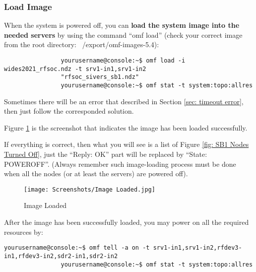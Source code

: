 \documentclass{article}
\begin{document}
    
        \subsubsection{Load Image}
            When the system is powered off, you can \textbf{load the system image into the needed servers} by using the command ``omf load'' (check your correct image from the root directory: ~/export/omf-images-5.4):
            \begin{verbatim}
                yourusername@console:~$ omf load -i wides2021_rfsoc.ndz -t srv1-in1,srv1-in2
                "rfsoc_sivers_sb1.ndz"
                yourusername@console:~$ omf stat -t system:topo:allres
            \end{verbatim}
            
            
            Sometimes there will be an error that described in Section \ref{sec: timeout error}, then just follow the corresponded solution. 
            
            Figure \ref{fig: Image Loaded} is the screenshot that indicates the image has been loaded successfully. 
            
            If everything is correct, then what you will see is a list of Figure \ref{fig: SB1 Nodes Turned Off}, just the ``Reply: OK'' part will be replaced by ``State: POWEROFF''. (Always remember such image-loading process must be done when all the nodes (or at least the servers) are powered off). 
            \begin{figure}[ht]
                \centering
                \texttt{[image: Screenshots/Image Loaded.jpg]}
                \caption{Image Loaded}
                \vspace*{0mm}
                \label{fig: Image Loaded}
            \end{figure}
            
            After the image has been successfully loaded, you may power on all the required resources by:
            \begin{verbatim}
yourusername@console:~$ omf tell -a on -t srv1-in1,srv1-in2,rfdev3-in1,rfdev3-in2,sdr2-in1,sdr2-in2
                yourusername@console:~$ omf stat -t system:topo:allres
            \end{verbatim}
            
\end{document}
